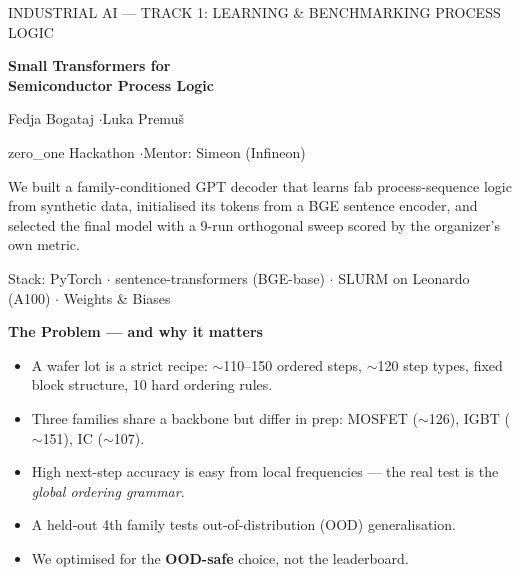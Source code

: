\documentclass[12pt]{article}
\newcommand{\slide}[2]{%
  \begingroup
  {\color{navy}\Huge\bfseries #1\par}%
  \vspace{2pt}{\color{accent}\rule{\linewidth}{2pt}}\par
  \vspace{14pt}\Large #2
  \endgroup
  \clearpage}
\begin{document}
\thispagestyle{empty}
\vspace*{2.2cm}
\begin{center}
{\color{accent}\large INDUSTRIAL AI --- TRACK 1: LEARNING \& BENCHMARKING PROCESS LOGIC}\par
\vspace{18pt}
{\color{navy}\fontsize{34}{40}\selectfont\bfseries Small Transformers for\\[4pt] Semiconductor Process Logic}\par
\vspace{10pt}{\color{accent}\rule{0.45\linewidth}{2pt}}\par
\vspace{22pt}
{\Large Fedja Bogataj \quad$\cdot$\quad Luka Premu\v{s}}\par
\vspace{6pt}
{\large zero\_one Hackathon \quad$\cdot$\quad Mentor: Simeon (Infineon)}\par
\vspace{26pt}
\begin{minipage}{0.8\linewidth}\centering\large
We built a family-conditioned GPT decoder that learns fab process-sequence
logic from synthetic data, initialised its tokens from a BGE sentence encoder,
and selected the final model with a 9-run orthogonal sweep scored by the
organizer's own metric.
\end{minipage}\par
\vspace{20pt}
{\normalsize Stack: PyTorch $\cdot$ sentence-transformers (BGE-base) $\cdot$ SLURM on Leonardo (A100) $\cdot$ Weights \& Biases}
\end{center}
\clearpage

\slide{The Problem --- and why it matters}{
\begin{itemize}
  \item A wafer lot is a strict recipe: $\sim$110--150 ordered steps, $\sim$120 step types, fixed block structure, 10 hard ordering rules.
  \item Three families share a backbone but differ in prep: MOSFET ($\sim$126), IGBT ($\sim$151), IC ($\sim$107).
  \item High next-step accuracy is easy from local frequencies --- the real test is the \emph{global ordering grammar}.
  \item A held-out 4th family tests out-of-distribution (OOD) generalisation.
  \item We optimised for the \textbf{OOD-safe} choice, not the leaderboard.
\end{itemize}}
\end{document}
